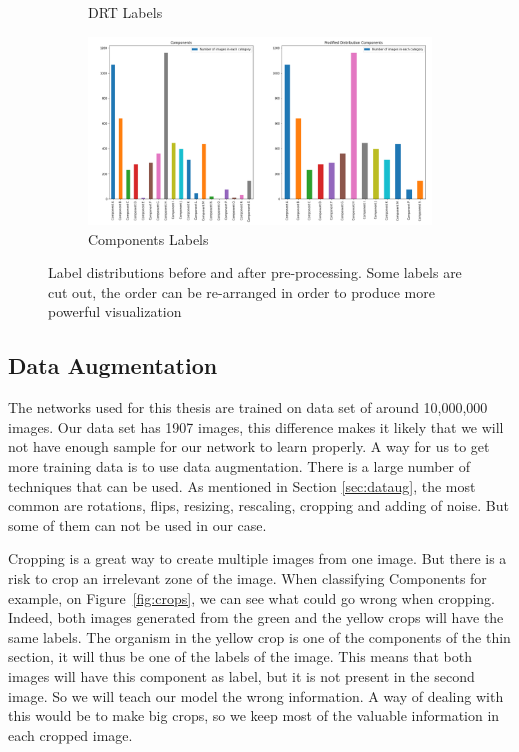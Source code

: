 \begin{figure}
\begin{subfigure}{.5\textwidth}
  \caption{DRT Labels}
  \label{fig:drtlab}
\end{subfigure}%
\begin{subfigure}{.5\textwidth}
  \centering
  \includegraphics[width=.8\linewidth]{figures/03-Components.PNG}
  \caption{Components Labels}
  \label{fig:compolab}
\end{subfigure}
\caption[Pre processing of labels]{Label distributions before and after pre-processing. Some labels are cut out,  the order can be re-arranged in order to produce more powerful visualization}
\label{fig:labelsdistrib}
\end{figure}

\subsection{Data Augmentation}
The networks used for this thesis are trained on data set of around 10,000,000 images. Our data set has 1907 images, this difference makes it likely that we will not have enough sample for our network to learn properly. A way for us to get more training data is to use data augmentation.  There is a  large number of techniques that can be used. As mentioned in Section \ref{sec:dataug}, the most common are rotations, flips, resizing, rescaling, cropping and adding of noise. But some of them can not be used in our case. 

Cropping is a great way to create multiple images from one image. But there is a risk to crop an irrelevant zone of the image. When classifying Components for example, on Figure~\ref{fig:crops}, we can see what could go wrong when cropping. Indeed, both images generated from the green and the yellow crops will have the same labels. The organism in the yellow crop is one of the components of the thin section, it will thus be one of the labels of the image. This means that both images will have this component as label, but it is not present in the second image. So we will teach our model the wrong information. A way of dealing with this would be to make big crops, so we keep most of the valuable information in each cropped image.  

